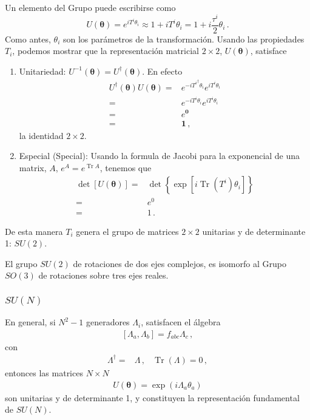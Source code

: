 Un elemento del Grupo puede escribirse como
\begin{equation}
  \label{eq:63qft}
  U(\boldsymbol{\theta})=e^{iT^i \theta_i }\approx1+iT^i\theta_i=1+i\frac{\tau^i}{2}\theta_i\,.
\end{equation}
Como antes, $\theta_i$ son los parámetros de la transformación.  Usando las propiedades $T_i$, podemos mostrar que la representación matricial $2\times 2$, $U(\boldsymbol{\theta})$, satisface
\begin{enumerate}
\item Unitariedad: $U^{-1}(\boldsymbol{\theta})=U^{\dagger}(\boldsymbol{\theta})$. En efecto
  \begin{align*}
    U^{\dagger}(\boldsymbol{\theta})U(\boldsymbol{\theta})=&e^{-i{T^i}^{\dagger} \theta_i }e^{iT^i \theta_i }\nonumber\\
=&e^{-i T^i \theta_i }e^{iT^i \theta_i } \nonumber\\
=&e^{\mathbf{0}}\nonumber\\
=&\mathbf{1}\,,
  \end{align*}
la identidad $2\times 2$.
\item Especial (Special): Usando la formula de Jacobi para la exponencial de una matrix, $A$, $e^{A}=e^{\operatorname{Tr}A}$, tenemos que
  \begin{align*}
   \det[U(\boldsymbol{\theta})]=&\det\left\{\exp\left[  i \operatorname{Tr}\left( T^i \right)\theta_i \right]  \right\}\nonumber\\
                           =&e^{0}\nonumber\\
                           =&1\,.
  \end{align*}
\end{enumerate}
De esta manera $T_i$ genera el grupo de matrices $2\times 2$ unitarias y de determinante 1: $SU(2)$. 

El grupo $SU(2)$ de rotaciones de dos ejes complejos, es isomorfo al Grupo $SO(3)$ de rotaciones sobre tres ejes reales.

\subsubsection{$SU(N)$}


En general, si $N^{2}-1$ generadores $\Lambda_i$, satisfacen el álgebra
\begin{align}
  \left[ \Lambda_a,\Lambda_b \right]=f_{abc}\Lambda_{c}\,,
\end{align}
con
\begin{align}
  \Lambda^{\dagger}=&\Lambda\,, & \operatorname{Tr}(\Lambda)=0\,,
\end{align}
entonces las matrices $N\times N$  
\begin{align}
  U(\boldsymbol{\theta})=\exp\left( i \Lambda_{a}\theta_{a} \right)
\end{align}
son unitarias y de determinante 1, y constituyen la representación fundamental de $SU(N)$.

